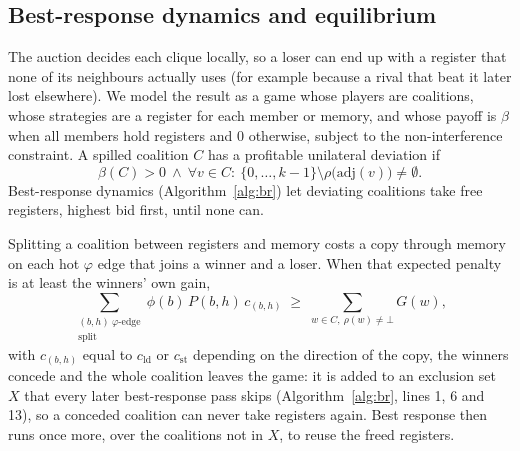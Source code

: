 \documentclass{ieeeaccess}
\newcommand{\cld}{c_{\mathrm{ld}}}
\newcommand{\cst}{c_{\mathrm{st}}}
\begin{document}
\subsection{Best-response dynamics and equilibrium}

The auction decides each clique locally, so a loser can end up with a
register that none of its neighbours actually uses (for example
because a rival that beat it later lost elsewhere). We model the result
as a game whose players are coalitions, whose strategies are a
register for each member or memory, and whose payoff is $\beta$ when
all members hold registers and $0$ otherwise, subject to the
non-interference constraint. A spilled coalition $C$ has a profitable
unilateral deviation if
\begin{equation}
\beta(C)>0\ \wedge\ \forall v\in C:\ \{0,\dots,k{-}1\}\setminus\rho\big(\mathrm{adj}(v)\big)\neq\emptyset .
\label{eq:nash}
\end{equation}
Best-response dynamics (Algorithm~\ref{alg:br}) let deviating
coalitions take free registers, highest bid first, until none can.

Splitting a coalition between registers and memory costs a copy through
memory on each hot $\varphi$ edge that joins a winner and a loser. When
that expected penalty is at least the winners' own gain,
\begin{equation}
\sum_{\substack{(b,h)\ \varphi\text{-edge}\\ \text{split}}}\phi(b)\,P(b,h)\,c_{(b,h)}
\;\ge\;\sum_{w\in C,\ \rho(w)\neq\bot}G(w),
\label{eq:repair}
\end{equation}
with $c_{(b,h)}$ equal to $\cld$ or $\cst$ depending on the direction of
the copy, the winners concede and the whole coalition leaves the
game: it is added to an exclusion set $X$ that every later
best-response pass skips (Algorithm~\ref{alg:br}, lines 1, 6 and 13),
so a conceded coalition can never take registers again. Best response
then runs once more, over the coalitions not in $X$, to reuse the freed
registers.
\end{document}
